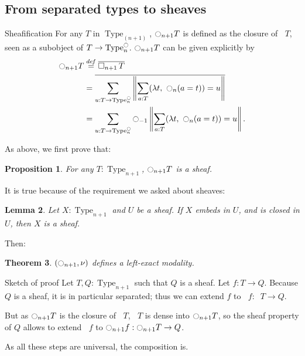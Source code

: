 \documentclass{beamer}
\newtheorem{thm}{Theorem}
\newtheorem{prop}[thm]{Proposition}
\newtheorem{lem}[thm]{Lemma}
\newcommand \defeq {\overset{de\hspace{-0.2ex}f}{=}}
\DeclareMathOperator{\Type}{Type}
\newcommand{\modal}{\ensuremath{\ocircle}}
\newcommand \separated {\mathop{\square_{n+1}} }
\newcommand{\nType}[1]{\Type_{#1}}
\begin{document}
\subsection[Sheafification]{From separated types to sheaves}
\label{sec:from-separated-sheaves}

\begin{frame}{}{Sheafification}
  \note{ }
  For any $T$ in $\nType {(n+1)}$, 
  $\modal_{n+1}T$ is defined as the closure of $\separated T$,
  seen as a subobject of $T \to \nType n^\modal$. 
  $\modal_{n+1}T$ can be given explicitly by
  \begin{align*}
    \modal_{n+1} T &\defeq \overline{\separated T} \\
    &= \overline{\sum_{u:T \to \nType n^\modal}\left\| \sum_{a:T} 
      (\lambda t,~\modal_n (a=t)) = u\right\|} \\
    &= \sum_{u:T \to \nType n^\modal} \modal_{-1}\left\| \sum_{a:T} 
      (\lambda t,~\modal_n (a=t)) = u\right\|.
\end{align*}
\end{frame}

\begin{frame}
  \note{ }
  As above, we first prove that:
  \begin{prop}
    For any $T:\nType {n+1}$, $\modal_{n+1}T$ is a sheaf.
  \end{prop}
  It is true because of the requirement we asked about sheaves:
  \begin{lem}
    Let $X:\nType {n+1}$ and $U$ be a sheaf. If $X$ embeds
    in $U$, and is closed in $U$, then $X$ is a sheaf.
  \end{lem}

  \pause
  \vspace{1em}

  Then:
  \begin{thm}
    $(\modal_{n+1},\nu)$ defines a left-exact modality.
  \end{thm}
\end{frame}

\begin{frame}{Sketch of proof}
  Let $T,Q:\nType {n+1}$ such that $Q$ is a sheaf. Let $f:T\to Q$.
  Because $Q$ is a sheaf, it is in particular separated;
  thus we can extend $f$ to $\separated f:\separated T\to Q$.
  \pause
  \vspace{1em}

  But as $\modal_{n+1} T$ is the closure of $\separated T$, $\separated T$ is dense
  into $\modal_{n+1} T$, so the sheaf property of $Q$ allows to extend
  $\separated f$ to $\modal_{n+1} f:\modal_{n+1} T \to Q$.

  As all these steps are universal, the composition is.
\end{frame}
\end{document}
